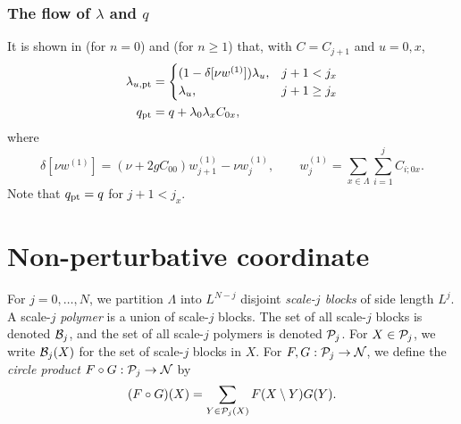 \subsubsection{The flow of \texorpdfstring{$\lambda$ and $q$}{lambda and q}}

It is shown in \cite[\eqref{pt-e:lambdapt2}--\eqref{pt-e:qpt2}]{BBS-rg-pt} (for $n = 0$)
and \cite[Proposition~\ref{phi4-prop:pt}]{ST-phi4} (for $n \ge 1$) that,
with $C = C_{j+1}$ and $u = 0, x$,
\begin{align}
\label{e:lampt}
\lambda_{u,{\rm pt}}
	&=
\begin{cases}
(1 - \delta[\nu w^{(1)}]) \lambda_u,
	& j + 1 < j_x \\
\lambda_u,
	& j + 1 \ge j_x
\end{cases}
	\\
\label{e:qpt}
q_{\rm pt}
	&=
q + \lambda_0 \lambda_x C_{0x},
\end{align}
where
\begin{equation}
\label{e:deltanuw1}
\delta[\nu w^{(1)}] = (\nu + 2 g C_{00}) w^{(1)}_{j+1} - \nu w^{(1)}_j,
	\qquad
w^{(1)}_j = \sum_{x\in\Lambda} \sum_{i=1}^j C_{i;0x}.
\end{equation}
Note that $q_{\rm pt} = q$ for $j + 1 < j_x$.



\section{Non-perturbative coordinate}
\label{sec:rgcoord}

For $j=0,\ldots, N$, we partition $\Lambda$ into $L^{N-j}$ disjoint
\emph{scale-$j$ blocks} of side length $L^j$.
A scale-$j$ \emph{polymer} is a union of scale-$j$ blocks.
The set of all scale-$j$ blocks is denoted $\mathcal{B}_j$, and
the set of all scale-$j$ polymers is denoted $\mathcal{P}_j$.
For $X \in \mathcal{P}_j$, we write $\mathcal{B}_j(X)$ for the set of scale-$j$ blocks in $X$.
For $F, G : \mathcal{P}_j \rightarrow \mathcal{N}$, we define the \emph{circle product} $F \circ G : \mathcal{P}_j \rightarrow \mathcal{N}$ by
\begin{equation}
(F \circ G)(X) = \sum_{Y\in\mathcal{P}_j(X)} F(X \setminus Y) G(Y).
\end{equation}

